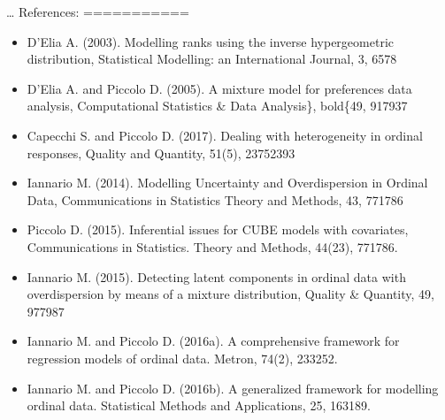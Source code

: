 \documentclass[letterpaper,10pt,english]{sphinxmanual}
\begin{document}
\sphinxAtStartPar
…
References:
===========
\begin{itemize}
\item {} 
\sphinxAtStartPar
D’Elia A. (2003). Modelling ranks using the inverse hypergeometric distribution, Statistical Modelling: an International Journal, 3, 65\textendash{}78

\item {} 
\sphinxAtStartPar
D’Elia A. and Piccolo D. (2005). A mixture model for preferences data analysis, Computational Statistics \& Data Analysis\},  bold\{49, 917\textendash{}937

\item {} 
\sphinxAtStartPar
Capecchi S. and Piccolo D. (2017). Dealing with heterogeneity in ordinal responses, Quality and Quantity, 51(5), 2375\textendash{}2393

\item {} 
\sphinxAtStartPar
Iannario M. (2014). Modelling Uncertainty and Overdispersion in Ordinal Data, Communications in Statistics \sphinxhyphen{} Theory and Methods, 43, 771\textendash{}786

\item {} 
\sphinxAtStartPar
Piccolo D. (2015). Inferential issues for CUBE models with covariates, Communications in Statistics. Theory and Methods, 44(23), 771\textendash{}786.

\item {} 
\sphinxAtStartPar
Iannario M. (2015). Detecting latent components in ordinal data with overdispersion by means of a mixture distribution, Quality \& Quantity, 49, 977\textendash{}987

\item {} 
\sphinxAtStartPar
Iannario M. and Piccolo D. (2016a). A comprehensive framework for regression models of ordinal data. Metron, 74(2), 233\textendash{}252.

\item {} 
\sphinxAtStartPar
Iannario M. and Piccolo D. (2016b). A generalized framework for modelling ordinal data. Statistical Methods and Applications, 25, 163\textendash{}189.

\end{itemize}
\end{document}
